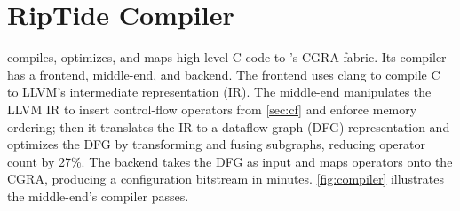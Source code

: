 \newcommand{\pes}{PEs\xspace}
\newcommand{\fend}{frontend\xspace}
\newcommand{\mend}{middle-end\xspace}
\newcommand{\bend}{backend\xspace}

\section{RipTide Compiler}
\label{sec:compiler}

\riptidecomp compiles, optimizes, and maps high-level C code to \riptide's CGRA fabric. 
%
%
%
%
%
Its compiler has a \fend, \mend, and \bend.
%
The \fend uses clang to compile C to LLVM's intermediate representation (IR).
%
% 
The \mend manipulates the LLVM IR to insert control-flow operators from  \autoref{sec:cf} and enforce memory ordering; then it translates the IR to a dataflow graph (DFG) representation and optimizes the DFG by transforming and fusing subgraphs, reducing operator count by 27\%. 
%
%
%
%
The \bend takes the DFG as input and maps operators onto the CGRA,
producing a configuration bitstream in minutes.
%
\autoref{fig:compiler} illustrates the \mend's compiler passes. 
%

